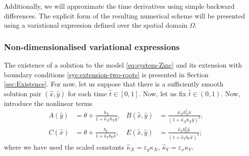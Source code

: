 \documentclass[11pt]{article}
\numberwithin{equation}{section}
\begin{document}

Additionally, we will approximate the time derivatives using simple backward differences. The explicit form of the resulting numerical scheme will be presented using a variational expression defined over the spatial domain \(\Omega\). 




\subsubsection{Non-dimensionalised variational expressions}
\label{sus:non-dim-base}


The existence of a solution to the model \eqref{eq:system-Zinc} and its extension with boundary conditions \eqref{sys:extension-two-roots} is presented in Section \ref{sec:Existence}. 
%
For now, let us suppose that there is a sufficiently smooth solution pair $(\hat x, \hat y)$ for each time \(\hat{t}\in [0,1]\). Now, let us fix \(\hat{t} \in (0,1)\). Now, introduce the nonlinear terms
\begin{align}
    A(\hat{y}) &= \theta + \frac{b_X}{1 + \hat{\kappa}_X b_X \hat{y}},
    &
    B(\hat{x},\hat{y}) &= \frac{\hat{\kappa}_X b_X^2 \hat{x}}{(1+\hat{\kappa}_X b_X \hat{y})^2},
    \\
    C(\hat{x}) &= \theta + \frac{b_Y}{1 + \hat{\kappa}_Y b_Y \hat{x}},
    &
    E(\hat{x},\hat{y}) &= \frac{\hat{\kappa}_Y b_Y^2 \hat{y}}{(1+\hat{\kappa}_Y b_Y \hat{x})^2};
\end{align}
where we have used the scaled constants \(\hat{\kappa}_X = \varepsilon_y \kappa_X\), \(\hat{\kappa}_Y = \varepsilon_x \kappa_Y\). 
\end{document}
